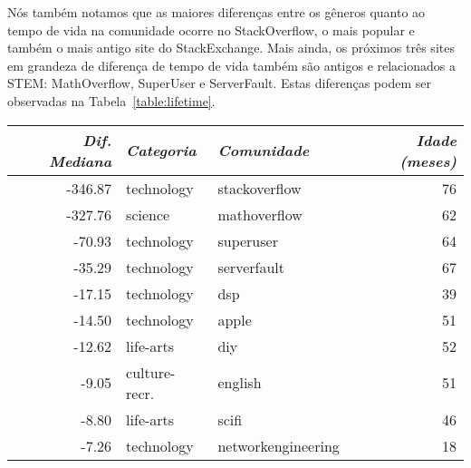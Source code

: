 
Nós também notamos que as maiores diferenças entre os gêneros quanto ao tempo de vida na comunidade ocorre no StackOverflow, o mais popular e também o mais antigo site do StackExchange. Mais ainda, os próximos três sites em grandeza de diferença de tempo de vida também são antigos e relacionados a STEM: MathOverflow, SuperUser e ServerFault. Estas diferenças podem ser observadas na Tabela~\ref{table:lifetime}. 

\begin{table}[h]
\centering
\begin{tabular}{@{}rllr@{}}
\toprule
{\small\textit{Dif. Mediana}} & {\small \textit{Categoria}} & {\small \textit{Comunidade}} & {\small \textit{Idade (meses) }} \\ \midrule
-346.87                            & technology         & stackoverflow      & 76                 \\ \midrule
-327.76                           & science            & mathoverflow       & 62                 \\ \midrule
-70.93                            & technology         & superuser          & 64                 \\ \midrule
-35.29                            & technology         & serverfault        & 67                 \\ \midrule
-17.15                            & technology         & dsp                & 39                 \\ \midrule
-14.50                            & technology         & apple              & 51                 \\ \midrule
-12.62                            & life-arts          & diy                & 52                 \\ \midrule
-9.05                             & culture-recr. & english            & 51                 \\ \midrule
-8.80                             & life-arts          & scifi              & 46                 \\ \midrule
-7.26                             & technology         & networkengineering & 18                 \\ \midrule

\end{tabular}
\end{table}
